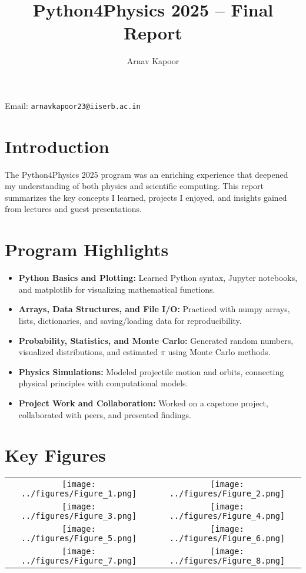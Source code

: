 \documentclass[12pt]{article}
\title{Python4Physics 2025 -- Final Report}
\author{Arnav Kapoor}
\date{}
\begin{document}
\maketitle
\noindent Email: \texttt{arnavkapoor23@iiserb.ac.in}

\section*{Introduction}
The Python4Physics 2025 program was an enriching experience that deepened my understanding of both physics and scientific computing. This report summarizes the key concepts I learned, projects I enjoyed, and insights gained from lectures and guest presentations.

\section*{Program Highlights}
\begin{itemize}
  \item \textbf{Python Basics and Plotting:} Learned Python syntax, Jupyter notebooks, and matplotlib for visualizing mathematical functions.
  \item \textbf{Arrays, Data Structures, and File I/O:} Practiced with numpy arrays, lists, dictionaries, and saving/loading data for reproducibility.
  \item \textbf{Probability, Statistics, and Monte Carlo:} Generated random numbers, visualized distributions, and estimated $\pi$ using Monte Carlo methods.
  \item \textbf{Physics Simulations:} Modeled projectile motion and orbits, connecting physical principles with computational models.
  \item \textbf{Project Work and Collaboration:} Worked on a capstone project, collaborated with peers, and presented findings.
\end{itemize}


\section*{Key Figures}
\begin{center}
\setlength{\tabcolsep}{8pt}
\renewcommand{\arraystretch}{1.2}
\begin{tabular}{cc}
\texttt{[image: ../figures/Figure\_1.png]} &
\texttt{[image: ../figures/Figure\_2.png]} \\
\texttt{[image: ../figures/Figure\_3.png]} &
\texttt{[image: ../figures/Figure\_4.png]} \\
\texttt{[image: ../figures/Figure\_5.png]} &
\texttt{[image: ../figures/Figure\_6.png]} \\
\texttt{[image: ../figures/Figure\_7.png]} &
\texttt{[image: ../figures/Figure\_8.png]} \\
\end{tabular}
\end{center}
\end{document}

